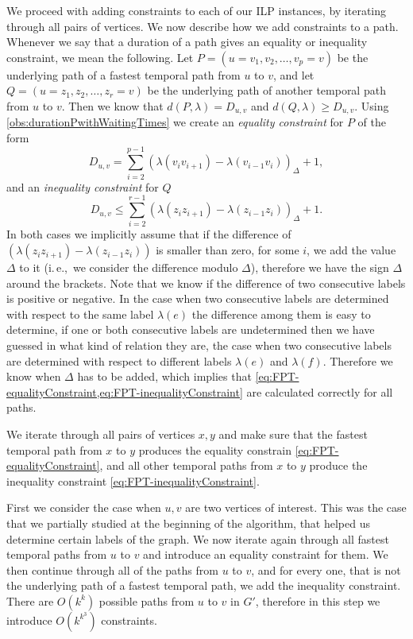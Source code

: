 \documentclass[11pt,a4paper]{article}
\theoremstyle{remark}
\theoremstyle{definition}
\newcommand{\ie}{i.\,e.,\ }
\begin{document}
We proceed with adding constraints to each of our ILP instances, by iterating through all pairs of vertices.
We now describe how we add constraints to a path. Whenever we say that a duration of a path gives an equality or inequality constraint, we mean the following.
Let $P=(u=v_1,v_2, \dots, v_p = v)$ be the underlying path of a fastest temporal path from $u$ to $v$,
and let $Q = (u=z_1,z_2, \dots, z_r = v)$ be the underlying path of another temporal path from $u$ to $v$.
Then we know that $d(P,\lambda) = D_{u,v}$ and $d(Q, \lambda) \geq D_{u,v}$.
Using \cref{obs:durationPwithWaitingTimes}
we create an \emph{equality constraint} for $P$
of the form 
\begin{equation}\label{eq:FPT-equalityConstraint}
    D_{u,v} = \sum _ {i=2} ^ {p-1} (\lambda (v_{i}v_{i+1}) - \lambda (v_{i-1}v_i))_\Delta + 1,
\end{equation}
and an \emph{inequality constraint} for $Q$ 
\begin{equation}\label{eq:FPT-inequalityConstraint}
    D_{u,v} \leq \sum _ {i=2} ^ {r-1} (\lambda (z_{i}z_{i+1}) - \lambda (z_{i-1}z_i))_\Delta + 1.
\end{equation}
In both cases we implicitly assume that if the difference of $(\lambda (z_{i}z_{i+1}) - \lambda (z_{i-1}z_i))$ is smaller than zero, for some $i$, we add the value $\Delta$ to it (\ie we consider the difference modulo $\Delta$), therefore we have the sign $\Delta$ around the brackets.
Note that we know if the difference of two consecutive labels is positive or negative. 
In the case when two consecutive labels are determined with respect to the same label $\lambda(e)$ the difference among them is easy to determine,
if one or both consecutive labels are undetermined 
then we have guessed in what kind of relation they are,
the case when two consecutive labels are determined with respect to different labels $\lambda(e)$ and $\lambda(f)$.
Therefore we know when $\Delta$ has to be added, which implies that \cref{eq:FPT-equalityConstraint,eq:FPT-inequalityConstraint} are calculated correctly for all paths.

We iterate through all pairs of vertices $x,y$ and make sure that the fastest temporal path from $x$ to $y$ produces the equality constrain \cref{eq:FPT-equalityConstraint},
and all other temporal paths from $x$ to $y$ produce the inequality constraint \cref{eq:FPT-inequalityConstraint}.

First we consider the case when $u,v$ are two vertices of interest.
This was the case that we partially studied at the beginning of the algorithm, that helped us determine certain labels of the graph.
We now iterate again through all fastest temporal paths from $u$ to $v$ and introduce an equality constraint for them.
We then continue 
through all of the paths from $u$ to $v$, and for every one, that is not the underlying path of a fastest temporal path, we add the inequality constraint.
There are $O(k^k)$ possible paths from $u$ to $v$ in $G'$, therefore in this step we introduce $O(k^{k^3})$ constraints.
\end{document}
